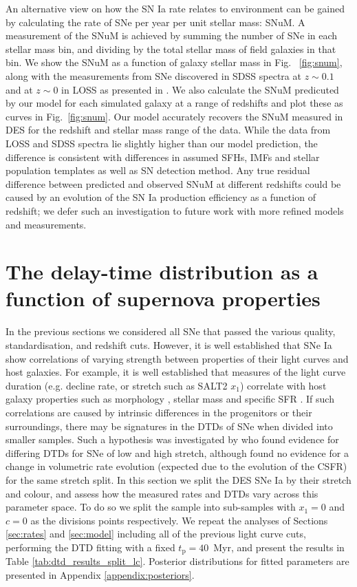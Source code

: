 \documentclass[fleqn,usenatbib]{mnras}
\begin{document}
An alternative view on how the SN Ia rate relates to environment can be gained by calculating the rate of SNe per year per unit stellar mass: SNuM. A measurement of the SNuM is achieved by summing the number of SNe in each stellar mass bin, and dividing by the total stellar mass of field galaxies in that bin. We show the SNuM as a function of galaxy stellar mass in Fig.~ \ref{fig:snum}, along with the measurements from SNe discovered in SDSS spectra \citep{Graur2013} at $z\sim0.1$ and at $z\sim0$ in LOSS as presented in \citet{Li2011a}. We also calculate the SNuM predicuted by our model for each simulated galaxy at a range of redshifts and plot these as curves in Fig.~\ref{fig:snum}. Our model accurately recovers the SNuM measured in DES for the redshift and stellar mass range of the data. While the data from LOSS and SDSS spectra lie slightly higher than our model prediction, the difference is consistent with differences in assumed SFHs, IMFs and stellar population templates as well as SN detection method. Any true residual difference between predicted and observed SNuM at different redshifts could be caused by an evolution of the SN Ia production efficiency as a function of redshift; we defer such an investigation to future work with more refined models and measurements.

\section{The delay-time distribution as a function of supernova properties}
\label{sec:split_x1_c}

In the previous sections we considered all SNe that passed the various quality, standardisation, and redshift cuts. However, it is well established that SNe Ia show correlations of varying strength between properties of their light curves and host galaxies. For example, it is well established that measures of the light curve duration (e.g. decline rate, or stretch such as SALT2 $x_1$) correlate with host galaxy properties such as morphology \citep{Hamuy1995,Hamuy2000,Mannucci2005}, stellar mass \citep{Kelly2010,Lampeitl2010,Sullivan2010} and specific SFR \citep{Rigault2013,Rigault2018}. If such correlations are caused by intrinsic differences in the progenitors or their surroundings, there may be signatures in the DTDs of SNe when divided into smaller samples. Such a hypothesis was investigated by \citet{Brandt2010} who found evidence for differing DTDs for SNe of low and high stretch, although \citet{Perrett2012} found no evidence for a change in volumetric rate evolution (expected due to the evolution of the CSFR) for the same stretch split. In this section we split the DES SNe Ia by their stretch and colour, and assess how the measured rates and DTDs vary across this parameter space. To do so we split the sample into sub-samples with $x_1 = 0$ and $c=0$ as the divisions points respectively. We repeat the analyses of Sections \ref{sec:rates} and \ref{sec:model} including all of the previous light curve cuts, performing the DTD fitting with a fixed $t_{\mathrm{p}} = 40$~Myr, and present the results in Table \ref{tab:dtd_results_split_lc}. Posterior distributions for fitted parameters are presented in Appendix \ref{appendix:posteriors}.
\end{document}
